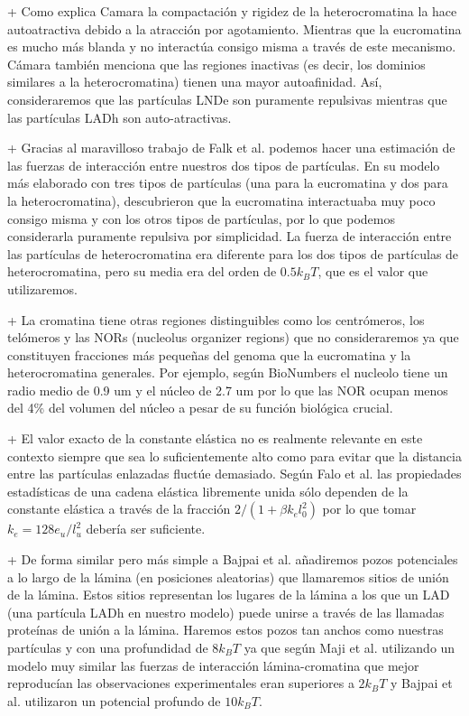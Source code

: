 + Como explica Camara la compactación y rigidez de la heterocromatina la hace autoatractiva debido a la atracción por agotamiento. Mientras que la eucromatina es mucho más blanda y no interactúa consigo misma a través de este mecanismo. Cámara también menciona que las regiones inactivas (es decir, los dominios similares a la heterocromatina) tienen una mayor autoafinidad. Así, consideraremos que las partículas LNDe son puramente repulsivas mientras que las partículas LADh son auto-atractivas.

+ Gracias al maravilloso trabajo de Falk et al. podemos hacer una estimación de las fuerzas de interacción entre nuestros dos tipos de partículas. En su modelo más elaborado con tres tipos de partículas (una para la eucromatina y dos para la heterocromatina), descubrieron que la eucromatina interactuaba muy poco consigo misma y con los otros tipos de partículas, por lo que podemos considerarla puramente repulsiva por simplicidad. La fuerza de interacción entre las partículas de heterocromatina era diferente para los dos tipos de partículas de heterocromatina, pero su media era del orden de $0.5k_BT$, que es el valor que utilizaremos.

+ La cromatina tiene otras regiones distinguibles como los centrómeros, los telómeros y las NORs (nucleolus organizer regions) que no consideraremos ya que constituyen fracciones más pequeñas del genoma que la eucromatina y la heterocromatina generales. Por ejemplo, según BioNumbers el nucleolo tiene un radio medio de 0.9 $\text{um}$ y el núcleo de 2.7 $\text{um}$ por lo que las NOR ocupan menos del 4\% del volumen del núcleo a pesar de su función biológica crucial.

+ El valor exacto de la constante elástica no es realmente relevante en este contexto siempre que sea lo suficientemente alto como para evitar que la distancia entre las partículas enlazadas fluctúe demasiado. Según Falo et al. las propiedades estadísticas de una cadena elástica libremente unida sólo dependen de la constante elástica a través de la fracción $2/(1+\beta k_el_0^2)$ por lo que tomar $k_e=128e_u/l_u^2$ debería ser suficiente.

+ De forma similar pero más simple a Bajpai et al. añadiremos pozos potenciales a lo largo de la lámina (en posiciones aleatorias) que llamaremos sitios de unión de la lámina. Estos sitios representan los lugares de la lámina a los que un LAD (una partícula LADh en nuestro modelo) puede unirse a través de las llamadas proteínas de unión a la lámina. Haremos estos pozos tan anchos como nuestras partículas y con una profundidad de $8k_BT$ ya que según Maji et al. utilizando un modelo muy similar las fuerzas de interacción lámina-cromatina que mejor reproducían las observaciones experimentales eran superiores a $2k_BT$ y Bajpai et al. utilizaron un potencial profundo de $10k_BT$.

